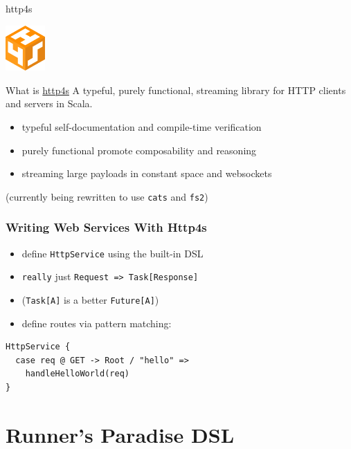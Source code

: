 \documentclass{beamer}
\begin{document}
\begin{frame}{http4s}
  \begin{center}
    \includegraphics[width=15mm]{../pics/http4s.png}
  \end{center}

  \begin{block}{What is \hyperlink{http://http4s.org/}{http4s}}
    A typeful, purely functional, streaming library for HTTP
    clients and servers in Scala.
  \end{block}
  \begin{itemize}
  \item typeful \textemdash{} self-documentation and compile-time verification
  \item purely functional \textemdash{} promote composability and reasoning
  \item streaming \textemdash{} large payloads in constant space and
    websockets
  \end{itemize}
  \begin{center}
    \alert{(currently being rewritten to use \texttt{cats} and \texttt{fs2})}
  \end{center}

\end{frame}

\begin{frame}[fragile]
  \frametitle{Writing Web Services With Http4s}
  \begin{itemize}
  \item define \texttt{HttpService} using the built-in DSL
  \item \texttt{really} just \texttt{Request => Task[Response]}
  \item (\texttt{Task[A]} is a better \texttt{Future[A]})
  \item define routes via pattern matching:
  \end{itemize}
\begin{verbatim}
HttpService {
  case req @ GET -> Root / "hello" =>
    handleHelloWorld(req)
}
\end{verbatim}
\end{frame}

\section{Runner's Paradise DSL}
\end{document}
